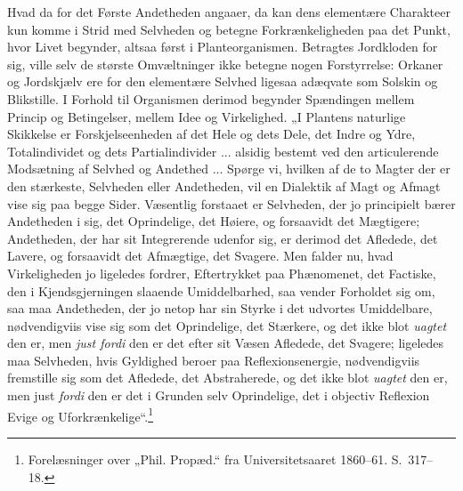 \documentclass[12pt]{book}
\newcommand{\opage}[1]{\marginnote{\footnotesize\textit{[#1]}}}
\begin{document}
Hvad da for det Første Andetheden angaaer, da kan dens elementære Charakteer kun komme i Strid med Selvheden og betegne Forkrænkeligheden paa det Punkt, hvor Livet begynder, altsaa først i Planteorganismen. Betragtes Jordkloden for sig, ville selv de største Omvæltninger ikke betegne nogen Forstyrrelse: Orkaner og Jordskjælv ere for den elementære Selvhed ligesaa adæqvate som Solskin og Blikstille. I Forhold til Organismen derimod begynder Spændingen mellem
\opage{453}Princip og Betingelser, mellem Idee og Virkelighed. „I Plantens naturlige Skikkelse er Forskjelseenheden af det Hele og dets Dele, det Indre og Ydre, Totalindividet og dets Partialindivider ... alsidig bestemt ved den articulerende Modsætning af Selvhed og Andethed ... Spørge vi, hvilken af de to Magter der er den stærkeste, Selvheden eller Andetheden, vil en Dialektik af Magt og Afmagt vise sig paa begge Sider. Væsentlig forstaaet er Selvheden, der jo principielt bærer Andetheden i sig, det Oprindelige, det Høiere, og forsaavidt det Mægtigere; Andetheden, der har sit Integrerende udenfor sig, er derimod det Afledede, det Lavere, og forsaavidt det Afmægtige, det Svagere. Men falder nu, hvad Virkeligheden jo ligeledes fordrer, Eftertrykket paa Phænomenet, det Factiske, den i Kjendsgjerningen slaaende Umiddelbarhed, saa vender Forholdet sig om, saa maa Andetheden, der jo netop har sin Styrke i det udvortes Umiddelbare, nødvendigviis vise sig som det Oprindelige, det Stærkere, og det ikke blot \emph{uagtet} den er, men \emph{just fordi} den er det efter sit Væsen Afledede, det Svagere; ligeledes maa Selvheden, hvis Gyldighed beroer paa Reflexionsenergie, nødvendigviis fremstille sig som det Afledede, det Abstraherede, og det ikke blot \emph{uagtet} den er, men just \emph{fordi} den er det i Grunden selv Oprindelige, det i objectiv Reflexion Evige og Uforkrænkelige“.\footnote{Forelæsninger over „Phil. Propæd.“ fra Universitetsaaret 1860--61. S.~317--18.}%
\end{document}
